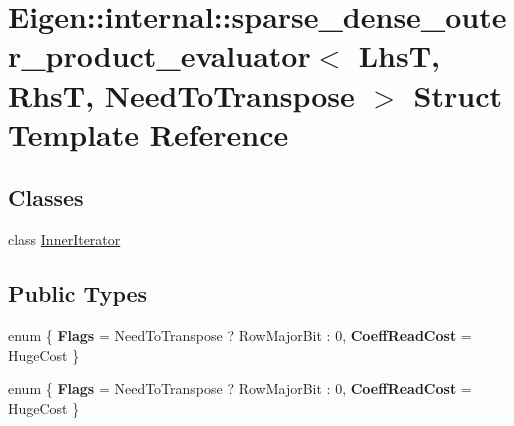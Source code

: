 \hypertarget{struct_eigen_1_1internal_1_1sparse__dense__outer__product__evaluator}{}\section{Eigen\+:\+:internal\+:\+:sparse\+\_\+dense\+\_\+outer\+\_\+product\+\_\+evaluator$<$ LhsT, RhsT, Need\+To\+Transpose $>$ Struct Template Reference}
\label{struct_eigen_1_1internal_1_1sparse__dense__outer__product__evaluator}
\subsection*{Classes}
\begin{DoxyCompactItemize}
\item 
class \hyperlink{class_eigen_1_1internal_1_1sparse__dense__outer__product__evaluator_1_1_inner_iterator}{Inner\+Iterator}
\end{DoxyCompactItemize}
\subsection*{Public Types}
\begin{DoxyCompactItemize}
\item 
\mbox{\label{struct_eigen_1_1internal_1_1sparse__dense__outer__product__evaluator_a05fa77070700f14884419707b3f67afd}} 
enum \{ {\bfseries Flags} = Need\+To\+Transpose ? Row\+Major\+Bit \+: 0, 
{\bfseries Coeff\+Read\+Cost} = Huge\+Cost
 \}
\item 
\mbox{\label{struct_eigen_1_1internal_1_1sparse__dense__outer__product__evaluator_a7a38839a136edae1a0df367dcf78a63e}} 
enum \{ {\bfseries Flags} = Need\+To\+Transpose ? Row\+Major\+Bit \+: 0, 
{\bfseries Coeff\+Read\+Cost} = Huge\+Cost
 \}
\end{DoxyCompactItemize}
